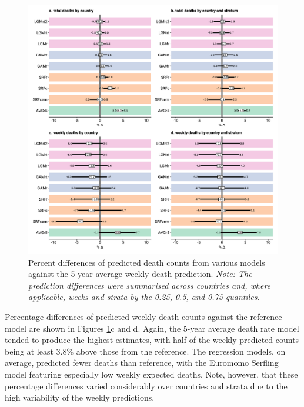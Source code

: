 \documentclass[12pt]{article}
\begin{document}
\begin{figure}
\caption{Percent differences of predicted death counts from various models against the 5-year average weekly death prediction. \emph{Note: The prediction differences were summarised across countries and, where applicable, weeks and strata by the 0.25, 0.5, and 0.75 quantiles.}}
\label{fig:baselinediff}
\includegraphics{baselinediff.pdf}
\end{figure}

Percentage differences of predicted weekly death counts against the reference model are shown in Figures \ref{fig:baselinediff}c and d. Again, the 5-year average death rate model tended to produce the highest estimates, with half of the weekly predicted counts being at least 3.8\% above those from the reference. The regression models, on average, predicted fewer deaths than reference, with the Euromomo Serfling model featuring especially low weekly expected deaths. Note, however, that these percentage differences varied considerably over countries and strata due to the high variability of the weekly predictions.

\end{document}
